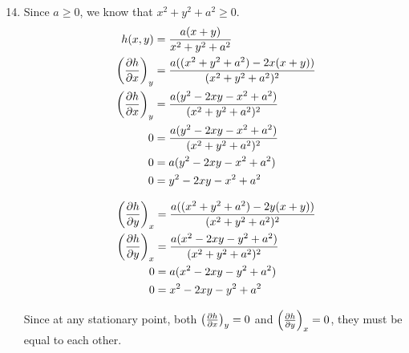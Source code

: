 \documentclass[10pt,\jkfside,a4paper]{article}
\begin{document}
\begin{enumerate}

\setcounter{enumi}{13}

\item 
Since $a \geq 0$, we know that $x^{2} + y^{2} + a^2 \geq 0$.
\begin{equation}
\begin{split}
h(x, y) &= \frac{a(x + y)}{x^{2} + y^{2} + a^2} \\
\left(\pdv{h}{x}\right)_y &= \frac{a((x^{2} + y^{2} + a^2) - 2x(x + y))}{(x^{2} + y^{2} + a^2)^2} \\
\left(\pdv{h}{x}\right)_y &= \frac{a(y^{2} - 2xy - x^{2} + a^2)}{(x^{2} + y^{2} + a^2)^2} \\
0 &= \frac{a(y^{2} - 2xy - x^{2} + a^2)}{(x^{2} + y^{2} + a^2)^2} \\
0 &= a(y^{2} - 2xy - x^{2} + a^2) \\
0 &= y^{2} - 2xy - x^{2} + a^2 \\
\end{split}
\end{equation}

\begin{equation}
\begin{split}
\left(\pdv{h}{y}\right)_x &= \frac{a((x^{2} + y^{2} + a^2) - 2y(x + y))}{(x^{2} + y^{2} + a^2)^2} \\
\left(\pdv{h}{y}\right)_x &= \frac{a(x^{2} - 2xy - y^{2} + a^2)}{(x^{2} + y^{2} + a^2)^2} \\
0 &= a(x^{2} - 2xy - y^{2} + a^2) \\
0 &= x^{2} - 2xy - y^{2} + a^2 \\
\end{split}
\end{equation}

Since at any stationary point, both $\left(\pdv{h}{x}\right)_y = 0$ and $\left(\pdv{h}{y}\right)_x = 0$, 
they must be equal to each other.


\end{enumerate}
\end{document}
